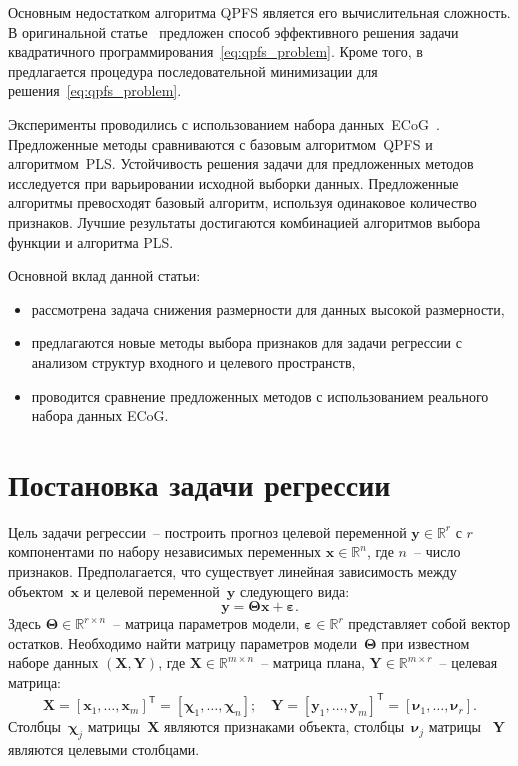 \documentclass[preprint,12pt]{elsarticle}
\theoremstyle{definition}
\newcommand{\bx}{\mathbf{x}}
\newcommand{\by}{\mathbf{y}}
\newcommand{\bY}{\mathbf{Y}}
\newcommand{\bX}{\mathbf{X}}
\newcommand{\bbR}{\mathbb{R}}
\newcommand{\T}{\mathsf{T}}
\newcommand{\bchi}{\boldsymbol{\chi}}
\newcommand{\bnu}{\boldsymbol{\nu}}
\newcommand{\bTheta}{\boldsymbol{\Theta}}
\begin{document}
Основным недостатком алгоритма QPFS является его вычислительная сложность. В оригинальной статье~\cite{rodriguez2010quadratic} предложен способ эффективного решения задачи квадратичного программирования~\eqref{eq:qpfs_problem}. Кроме того, в~\cite{prasad2013scaling} предлагается процедура последовательной минимизации для решения~\eqref{eq:qpfs_problem}.

Эксперименты проводились с использованием набора данных~ECoG~\cite{shimoda2012decoding}.
Предложенные методы сравниваются с базовым алгоритмом~QPFS и алгоритмом~PLS.
Устойчивость решения задачи для предложенных методов исследуется при варьировании исходной выборки данных.
Предложенные алгоритмы превосходят базовый алгоритм, используя одинаковое количество признаков.
Лучшие результаты достигаются комбинацией алгоритмов выбора функции и алгоритма PLS.

Основной вклад данной статьи:
\begin{itemize}
\item рассмотрена задача снижения размерности для данных высокой размерности,
\item предлагаются новые методы выбора признаков для задачи регрессии с анализом структур входного и целевого пространств,
\item проводится сравнение предложенных методов с использованием реального набора данных ECoG.
\end{itemize}


\section{Постановка задачи регрессии}

Цель задачи регрессии~-- построить прогноз целевой переменной $\by \in \bbR^r$ с $r$ компонентами по набору независимых переменных $\bx \in \bbR^n$, где $n$~-- число признаков.
Предполагается, что существует линейная зависимость между объектом~$\bx$ и целевой переменной~$\by$ следующего вида:
\begin{equation}
\by = \bTheta \bx+ \boldsymbol{\varepsilon}.
\label{eq:model}
\end{equation}
Здесь $\bTheta \in \bbR^{r \times n}$~-- матрица параметров модели, $\boldsymbol{\varepsilon} \in \bbR^{r}$ представляет собой вектор остатков.
Необходимо найти матрицу параметров модели~$\bTheta$ при известном наборе данных $\left( \bX, \bY \right)$, где $\bX \in \bbR^{m \times n}$~-- матрица плана, $\bY \in \bbR^{m \times r}$~-- целевая матрица:
\begin{equation*}
\bX = [\bx_1, \dots, \bx_m]^{\T} =  [\bchi_1, \dots, \bchi_n]; \quad \bY = [\by_1, \dots, \by_m]^{\T} =  [\bnu_1, \dots, \bnu_r].
\end{equation*}
Столбцы~$\bchi_j$ матрицы~$\bX$ являются признаками объекта, столбцы~$\bnu_j$ матрицы ~$\bY$ являются целевыми столбцами.
\end{document}
